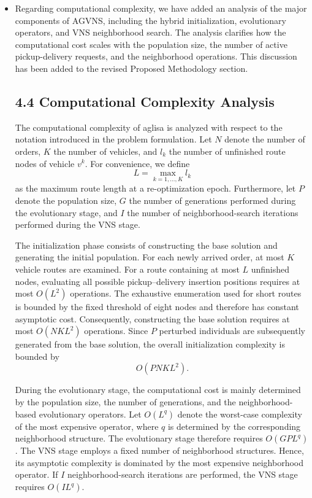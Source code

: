 \documentclass[11pt]{article}
\begin{document}
\begin{itemize}
    \item Regarding computational complexity, we have added an analysis of the major components of AGVNS, including the hybrid initialization, evolutionary operators, and VNS neighborhood search. The analysis clarifies how the computational cost scales with the population size, the number of active pickup-delivery requests, and the neighborhood operations. This discussion has been added to the revised Proposed Methodology section.
{
    \color{blue}
    \subsection*{4.4 Computational Complexity Analysis}

The computational complexity of \gls{aglisa} is analyzed with respect to the notation introduced in the problem formulation. Let $N$ denote the number of orders, $K$ the number of vehicles, and $l_k$ the number of unfinished 
route nodes of vehicle $v^k$. For convenience, we define
\[
L=\max_{k=1,\ldots,K} l_k
\]
as the maximum route length at a re-optimization epoch. Furthermore, let $P$ denote the population size, $G$ the number of generations performed during the evolutionary stage, and $I$ the number of neighborhood-search 
iterations performed during the VNS stage.

The initialization phase consists of constructing the base solution and generating the initial population. For each newly arrived order, at most $K$ vehicle routes are examined. For a route containing at most $L$ unfinished nodes, evaluating all possible pickup--delivery insertion 
positions requires at most $O(L^2)$ operations. The exhaustive enumeration used for short routes is bounded by the fixed threshold of eight nodes and therefore has constant asymptotic cost. Consequently, constructing the base solution requires at most $O(NKL^2)$ operations. Since $P$ perturbed individuals are subsequently generated from the base solution, the overall initialization complexity is bounded by
\[
O(PNKL^2).
\]

During the evolutionary stage, the computational cost is mainly determined by the population size, the number of generations, and the neighborhood-based evolutionary operators. Let $O(L^q)$ denote the worst-case complexity of the most expensive operator, where $q$ is determined by the corresponding neighborhood structure. The evolutionary stage therefore requires
$O(GPL^q)$.
The VNS stage employs a fixed number of neighborhood structures. Hence, its asymptotic complexity is dominated by the most expensive neighborhood operator. If $I$ neighborhood-search iterations are performed, the VNS stage 
requires $O(IL^q)$.

}
\end{itemize}
\end{document}
